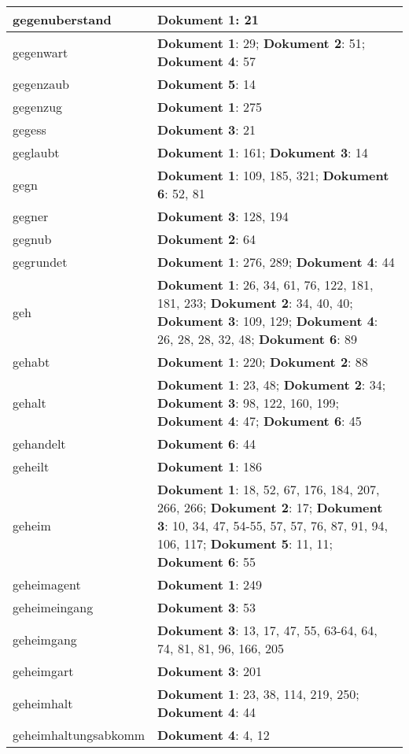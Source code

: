 \documentclass[a5paper]{article}
\begin{document}
\begin{longtable}[l]{|l|p{3in}|}
\hline
gegenuberstand & \textbf{Dokument 1}: 21 \\
\hline
gegenwart & \textbf{Dokument 1}: 29; \textbf{Dokument 2}: 51; \textbf{Dokument 4}: 57 \\
\hline
gegenzaub & \textbf{Dokument 5}: 14 \\
\hline
gegenzug & \textbf{Dokument 1}: 275 \\
\hline
gegess & \textbf{Dokument 3}: 21 \\
\hline
geglaubt & \textbf{Dokument 1}: 161; \textbf{Dokument 3}: 14 \\
\hline
gegn & \textbf{Dokument 1}: 109, 185, 321; \textbf{Dokument 6}: 52, 81 \\
\hline
gegner & \textbf{Dokument 3}: 128, 194 \\
\hline
gegnub & \textbf{Dokument 2}: 64 \\
\hline
gegrundet & \textbf{Dokument 1}: 276, 289; \textbf{Dokument 4}: 44 \\
\hline
geh & \textbf{Dokument 1}: 26, 34, 61, 76, 122, 181, 181, 233; \textbf{Dokument 2}: 34, 40, 40; \textbf{Dokument 3}: 109, 129; \textbf{Dokument 4}: 26, 28, 28, 32, 48; \textbf{Dokument 6}: 89 \\
\hline
gehabt & \textbf{Dokument 1}: 220; \textbf{Dokument 2}: 88 \\
\hline
gehalt & \textbf{Dokument 1}: 23, 48; \textbf{Dokument 2}: 34; \textbf{Dokument 3}: 98, 122, 160, 199; \textbf{Dokument 4}: 47; \textbf{Dokument 6}: 45 \\
\hline
gehandelt & \textbf{Dokument 6}: 44 \\
\hline
geheilt & \textbf{Dokument 1}: 186 \\
\hline
geheim & \textbf{Dokument 1}: 18, 52, 67, 176, 184, 207, 266, 266; \textbf{Dokument 2}: 17; \textbf{Dokument 3}: 10, 34, 47, 54-55, 57, 57, 76, 87, 91, 94, 106, 117; \textbf{Dokument 5}: 11, 11; \textbf{Dokument 6}: 55 \\
\hline
geheimagent & \textbf{Dokument 1}: 249 \\
\hline
geheimeingang & \textbf{Dokument 3}: 53 \\
\hline
geheimgang & \textbf{Dokument 3}: 13, 17, 47, 55, 63-64, 64, 74, 81, 81, 96, 166, 205 \\
\hline
geheimgart & \textbf{Dokument 3}: 201 \\
\hline
geheimhalt & \textbf{Dokument 1}: 23, 38, 114, 219, 250; \textbf{Dokument 4}: 44 \\
\hline
geheimhaltungsabkomm & \textbf{Dokument 4}: 4, 12 \\

\end{longtable}
\end{document}
